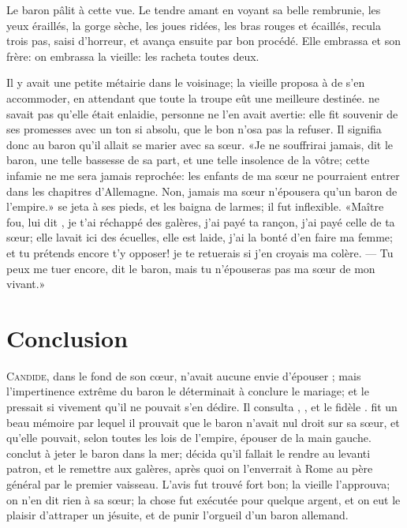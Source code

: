 Le baron pâlit à cette vue. Le tendre amant  en voyant sa belle
 rembrunie, les yeux éraillés, la gorge sèche, les joues
ridées, les bras rouges et écaillés, recula trois pas, saisi d’horreur,
et avança ensuite par bon procédé. Elle embrassa  et son frère:
on embrassa la vieille:  les racheta toutes deux.

Il y avait une petite métairie dans le voisinage; la vieille proposa à
 de s’en accommoder, en attendant que toute la troupe eût une
meilleure destinée.  ne savait pas qu’elle était enlaidie,
personne ne l’en avait avertie: elle fit souvenir  de ses
promesses avec un ton si absolu, que le bon  n’osa pas la
refuser. Il signifia donc au baron qu’il allait se marier avec sa
sœur. «Je ne souffrirai jamais, dit le baron, une telle bassesse de sa
part, et une telle insolence de la vôtre; cette infamie ne me sera
jamais reprochée: les enfants de ma sœur ne pourraient entrer dans les
chapitres d’Allemagne. Non, jamais ma sœur n’épousera qu’un baron de
l’empire.»  se jeta à ses pieds, et les baigna de larmes; il
fut inflexible. «Maître fou, lui dit , je t’ai réchappé des
galères, j’ai payé ta rançon, j’ai payé celle de ta sœur; elle lavait
ici des écuelles, elle est laide, j’ai la bonté d’en faire ma femme; et
tu prétends encore t’y opposer! je te retuerais si j’en croyais ma
colère. — Tu peux me tuer encore, dit le baron, mais tu n’épouseras pas
ma sœur de mon vivant.»




\chapter{Conclusion}


\lettrine{C}{andide}, dans le fond de son cœur, n’avait aucune envie d’épouser
; mais l’impertinence extrême du baron le déterminait à
conclure le mariage; et  le pressait si vivement qu’il ne
pouvait s’en dédire. Il consulta , , et le fidèle
.  fit un beau mémoire par lequel il prouvait que le
baron n’avait nul droit sur sa sœur, et qu’elle pouvait, selon toutes
les lois de l’empire, épouser  de la main gauche.  conclut
à jeter le baron dans la mer;  décida qu’il fallait le rendre au
levanti patron, et le remettre aux galères, après quoi on l’enverrait à
Rome au père général par le premier vaisseau. L’avis fut trouvé fort
bon; la vieille l’approuva; on n’en dit rien à sa sœur; la chose fut
exécutée pour quelque argent, et on eut le plaisir d’attraper un
jésuite, et de punir l’orgueil d’un baron allemand.


